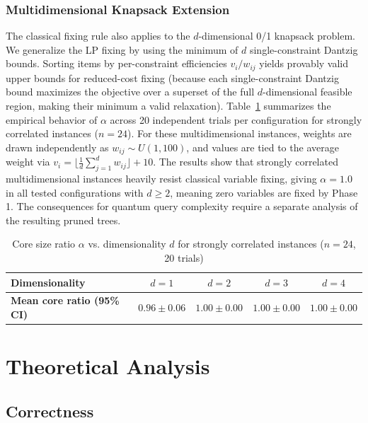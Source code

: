 \documentclass[pdflatex,sn-mathphys-num]{sn-jnl}
\begin{document}
\subsubsection{Multidimensional Knapsack Extension}
The classical fixing rule also applies to the $d$-dimensional 0/1 knapsack problem. We generalize the LP fixing by using the minimum of $d$ single-constraint Dantzig bounds. Sorting items by per-constraint efficiencies $v_i/w_{ij}$ yields provably valid upper bounds for reduced-cost fixing (because each single-constraint Dantzig bound maximizes the objective over a superset of the full $d$-dimensional feasible region, making their minimum a valid relaxation). Table~\ref{tab:multidim} summarizes the empirical behavior of $\alpha$ across 20 independent trials per configuration for strongly correlated instances ($n=24$). For these multidimensional instances, weights are drawn independently as $w_{ij} \sim U(1, 100)$, and values are tied to the average weight via $v_i = \lfloor \frac{1}{d} \sum_{j=1}^d w_{ij} \rfloor + 10$. The results show that strongly correlated multidimensional instances heavily resist classical variable fixing, giving $\alpha = 1.0$ in all tested configurations with $d \ge 2$, meaning zero variables are fixed by Phase 1. The consequences for quantum query complexity require a separate analysis of the resulting pruned trees.

\begin{table}[htbp]
\caption{Core size ratio $\alpha$ vs. dimensionality $d$ for strongly correlated instances ($n=24$, 20 trials)}
\label{tab:multidim}

\begin{tabular}{lcccc}
\toprule
\textbf{Dimensionality} & $d=1$ & $d=2$ & $d=3$ & $d=4$ \\
\midrule
\textbf{Mean core ratio (95\% CI)} & $0.96 \pm 0.06$ & $1.00 \pm 0.00$ & $1.00 \pm 0.00$ & $1.00 \pm 0.00$ \\
\bottomrule
\end{tabular}

\end{table}

\section{Theoretical Analysis}

\subsection{Correctness}
\end{document}
